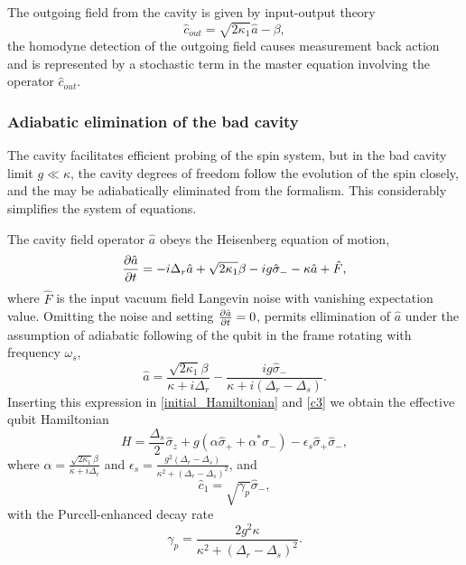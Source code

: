 \documentclass[aps,pra,twocolumn,groupedaddress,showpacs]{revtex4}
\begin{document}
The outgoing field from the cavity is given by input-output theory 
\begin{equation}
\hat c_{out} = \sqrt{2\kappa_1}\hat a - \beta,
\end{equation}
the homodyne detection of the outgoing  field causes measurement back action and is represented by a stochastic term in the master equation involving the operator $\hat c_{out}$. 

\subsubsection{Adiabatic elimination of the bad cavity}

The cavity facilitates efficient probing of the spin system, but in the bad cavity limit $g \ll \kappa$, the cavity degrees of freedom follow the evolution of the spin closely, and the may be adiabatically eliminated from the formalism.
This considerably simplifies the system of equations.


The cavity field operator $\hat a$ obeys the Heisenberg equation of motion,
\begin{equation}
\pdv{\hat a}{t} = - i \Delta_r \hat a + \sqrt{2\kappa_1}\beta - ig \hat \sigma_- - \kappa \hat a + \hat F,
\end{equation}
where $\hat F$ is the input vacuum field Langevin noise with vanishing expectation value. Omitting the noise and setting $\pdv{\hat a}{t}=0$, permits ellimination of $\hat a$ under the assumption of adiabatic following of the qubit in the frame rotating with frequency $\omega_s$,
\begin{equation}
\hat a = \frac{\sqrt{2\kappa_1}\beta}{\kappa + i \Delta_r} - \frac{i g \hat \sigma_-}{\kappa + i (\Delta_r - \Delta_s)}.
\end{equation}
Inserting this expression in \eqref{initial_Hamiltonian} and \eqref{c3} we obtain the effective qubit Hamiltonian
\begin{equation} \label{Hadel}
H = \frac{\Delta_s}{2} \hat \sigma_z + g(\alpha \hat \sigma_+ + \alpha^* \hat \sigma_-) - \epsilon_s \hat \sigma_+ \hat \sigma_-,
\end{equation}
where $\alpha=\frac{\sqrt{2\kappa_1}\beta}{\kappa + i \Delta_r}$ and $\epsilon_s = \frac{g^2 (\Delta_r - \Delta_s)}{\kappa^2 + (\Delta_r - \Delta_s)^2}$, and 
\begin{equation}
\hat c_1 = \sqrt{\gamma_p}\hat \sigma_-, \label{c1}
\end{equation}
with the Purcell-enhanced decay rate
\begin{equation}
\gamma_p = \frac{2 g^2 \kappa}{\kappa^2 + \left(\Delta_r - \Delta_s\right)^2}.
\end{equation}
\end{document}
